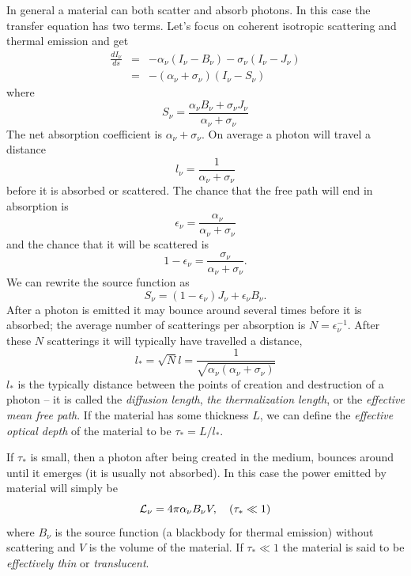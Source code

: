 In general a material can both scatter and absorb photons.  In this
case the transfer equation has two terms.  Let's focus on coherent
isotropic scattering and thermal emission and get
\begin{eqnarray}
\label{eq:92}
\frac{dI_\nu}{ds} &=& -\alpha_\nu \left (I_\nu - B_\nu \right ) -
\sigma_\nu \left (I_\nu - J_\nu \right ) \\
&=& -\left (\alpha_\nu + \sigma_\nu \right ) \left ( I_\nu - S_\nu
\right )
\label{eq:93}
\end{eqnarray}
where
\begin{equation}
S_\nu = \frac{\alpha_\nu B_\nu + \sigma_\nu J_\nu}{\alpha_\nu + \sigma_\nu}
\label{eq:94}
\end{equation}
The net absorption coefficient is $\alpha_\nu+\sigma_\nu.$ On average
a photon will travel a distance 
\begin{equation}
l_\nu = \frac{1}{\alpha_\nu + \sigma_\nu}
\label{eq:95}
\end{equation}
before it is absorbed or scattered.  The chance that the free path
will end in absorption is 
\begin{equation}
\epsilon_\nu = \frac{\alpha_\nu}{\alpha_\nu + \sigma_\nu}
\label{eq:96}
\end{equation}
and the chance that it will be scattered is 
\begin{equation}
1-\epsilon_\nu = \frac{\sigma_\nu}{\alpha_\nu + \sigma_\nu}.
\label{eq:97}
\end{equation}
We can rewrite the source function as
\begin{equation}
S_\nu = \left ( 1 - \epsilon_\nu \right ) J_\nu + \epsilon_\nu B_\nu.
\label{eq:98}
\end{equation}
After a photon is emitted it may bounce around several times before it
is absorbed; the average number of scatterings per absorption is 
$N=\epsilon_\nu^{-1}$.   After these $N$ scatterings it will typically
have travelled a distance,
\begin{equation}
l_* = \sqrt{N} l = \frac{1}{\sqrt{\alpha_\nu (\alpha_\nu+\sigma_\nu)}} 
\label{eq:99}
\end{equation}
$l_*$ is the typically distance between the points of creation and
destruction of a photon -- it is called the {\em diffusion length},
{\em the thermalization length}, or the {\em effective mean free
  path}.   If the material has some thickness $L$, we can define the
{\em effective optical depth} of the material to be 
$\tau_* = L/l_*$.

If $\tau_*$ is small, then a photon after being created in the medium,
bounces around until it emerges (it is usually not absorbed).  In this
case the power emitted by material will simply be 
\begin{equation}
{\cal L}_\nu = 4\pi \alpha_\nu B_\nu V, ~~~ (\tau_* \ll 1)
\label{eq:100}
\end{equation}
where $B_\nu$ is the source function (a blackbody for thermal
emission) without scattering and $V$ is the
volume of the material.  If $\tau_* \ll 1$ the material is said to be
{\em effectively thin} or {\em translucent}.

